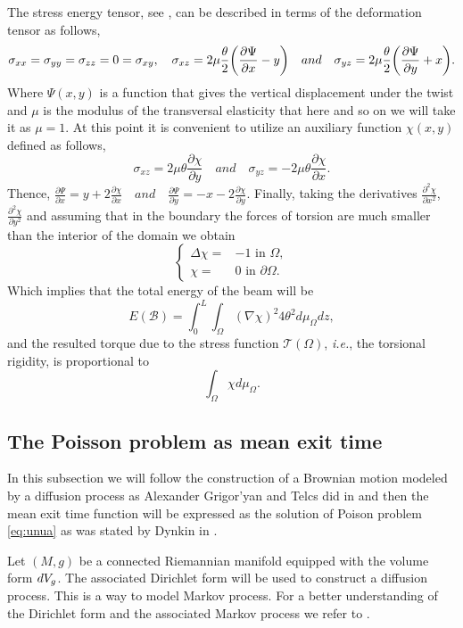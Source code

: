 \documentclass{amsart}
\theoremstyle{definition}
\theoremstyle{remark}
\newcommand{\V}{{\rm V}}
\begin{document}
The stress energy tensor, see \cite{LL},  can be described in terms of the deformation tensor as follows,
$$
\sigma_{xx}=\sigma_{yy}=\sigma_{zz}=0=\sigma_{xy},\quad \sigma_{xz}= 2\mu \frac{\theta}{2}\bigg( \frac{\partial \Psi}{\partial x} -y \bigg)\quad {\rm and} \quad \sigma_{yz}= 2\mu \frac{\theta}{2}\bigg( \frac{\partial \Psi}{\partial y} +x \bigg).
$$
Where $\Psi(x,y)$ is a function that gives the vertical displacement under the twist and $\mu$ is the modulus of the transversal elasticity that here and so on we will take it as $\mu=1$. At this point it is convenient to utilize an auxiliary function $\chi(x,y)$ defined as follows, 
$$
\sigma_{xz}= 2\mu\theta \frac{\partial \chi}{\partial y} \quad and \quad \sigma_{yz}= -2\mu\theta \frac{\partial \chi}{\partial x}.
$$
Thence, $
\frac{\partial \Psi}{\partial x}= y+2\frac{\partial \chi}{\partial x}\quad and \quad
\frac{\partial \Psi}{\partial y}= -x-2\frac{\partial \chi}{\partial y}
$. Finally, taking the derivatives $\frac{\partial^2\chi}{\partial x^2}$, $\frac{\partial^2\chi}{\partial y^2}$ and assuming that in the boundary the  forces of torsion are much smaller than the interior of the domain we obtain 
\begin{equation*}
    \left\lbrace
\begin{aligned}
    \Delta \chi=&-1 \text{ in } \Omega,\\
    {\chi}=&0\text{ in } \partial\Omega.
\end{aligned}
\right.
\end{equation*}
Which implies that the total energy of the beam will be
 $$
E(\mathcal{B})= \int^L_0 \int_\Omega (\nabla \chi)^2 4 \theta^2 d\mu_\Omega dz,
 $$
and the resulted torque due to the stress function $\mathcal{T}(\Omega)$, \emph{i.e.},  the  torsional rigidity, is proportional to
$$
\int_\Omega \chi d\mu_\Omega.
$$

\subsection{The Poisson problem as mean exit time} 
In this subsection we will follow the construction of a Brownian motion modeled by a diffusion process as Alexander Grigor’yan and  Telcs did in \cite{gg2} and then the mean exit time function will be expressed as the solution of Poison problem \eqref{eq:unua} as was stated by Dynkin in \cite{Dynkin}.  

Let $(M,g)$ be a connected Riemannian manifold equipped with the volume form $d\V_g$.  
The associated Dirichlet form will be used to construct a diffusion process. This  is a way to model Markov process. For a better understanding of the Dirichlet form and the associated Markov process we refer to \cite{FukushimaOshimaTakeda+2010}.
\end{document}
